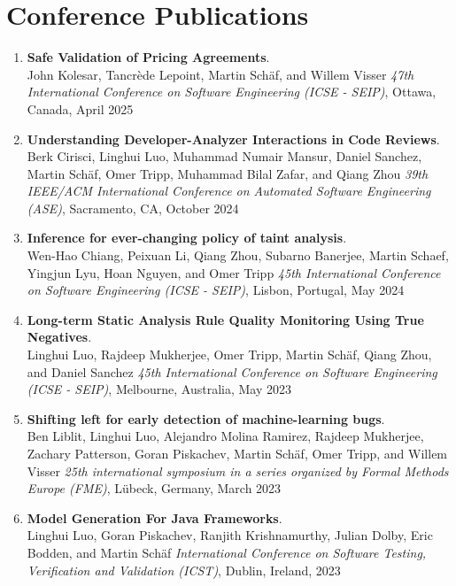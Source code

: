 \section{\sc Conference Publications}


\begin{enumerate}

  \item \textbf{Safe Validation of Pricing Agreements}.
  \\  John Kolesar, Tancr\`ede Lepoint, Martin Sch\"af, and Willem Visser
  \emph{47th International Conference on Software Engineering (ICSE - SEIP)},
  Ottawa, Canada, April 2025

  \item \textbf{Understanding Developer-Analyzer Interactions in Code Reviews}.
  \\  Berk Cirisci, Linghui Luo, Muhammad Numair
  Mansur, Daniel Sanchez, Martin Schäf, Omer Tripp, Muhammad
  Bilal Zafar, and Qiang Zhou
  \emph{39th IEEE/ACM International Conference on Automated Software Engineering (ASE)},
  Sacramento, CA, October 2024

  \item \textbf{Inference for ever-changing policy of taint analysis}.
  \\   Wen-Hao Chiang, Peixuan Li, Qiang Zhou, Subarno Banerjee, Martin Schaef, Yingjun Lyu, Hoan Nguyen, and Omer Tripp
  \emph{45th International Conference on Software Engineering (ICSE - SEIP)},
  Lisbon, Portugal, May 2024

\item \textbf{Long-term Static Analysis Rule Quality Monitoring Using True Negatives}.
\\  Linghui Luo, Rajdeep Mukherjee, Omer Tripp, Martin Sch\"af, Qiang Zhou, and Daniel Sanchez
\emph{45th International Conference on Software Engineering (ICSE - SEIP)},
Melbourne, Australia, May 2023

\item \textbf{Shifting left for early detection of machine-learning bugs}.
\\  Ben Liblit, Linghui Luo, Alejandro Molina Ramirez, Rajdeep Mukherjee, Zachary Patterson, Goran Piskachev, Martin Sch\"af, Omer Tripp, and Willem Visser
\emph{25th international symposium in a series organized by Formal Methods Europe (FME)},
L\"ubeck, Germany, March 2023


\item \textbf{Model Generation For Java Frameworks}.
\\  Linghui Luo, Goran Piskachev, Ranjith Krishnamurthy, Julian Dolby, Eric Bodden, and Martin Sch\"af
\emph{International Conference on Software Testing, Verification and Validation (ICST)},
Dublin, Ireland, 2023


\end{enumerate}
